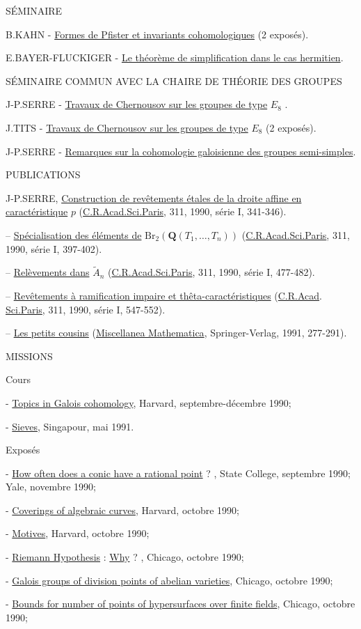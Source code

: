 \documentclass[11pt]{article}
\newcommand{\uline}[1]{\underline{#1}}
\begin{document}
SÉMINAIRE

B.KAHN - \uline{Formes de Pfister et invariants cohomologiques} (2 exposés).

E.BAYER-FLUCKIGER - \uline{Le théorème de simplification dans le cas hermitien}.

SÉMINAIRE COMMUN AVEC LA CHAIRE DE THÉORIE DES GROUPES

J-P.SERRE - \uline{Travaux de Chernousov sur les groupes de type} $E_8$ .

J.TITS - \uline{Travaux de Chernousov sur les groupes de type} $E_8$ (2 exposés).

J-P.SERRE - \uline{Remarques sur la cohomologie galoisienne des groupes semi-simples}.

PUBLICATIONS

J-P.SERRE, \uline{Construction de revêtements étales de la droite affine en}
\uline{caractéristique} $p$ (\uline{C.R.Acad.Sci.Paris}, 311, 1990, série I, 341-346).

-- \uline{Spécialisation des éléments de} $\mathrm{Br}_2(\mathbf{Q}(T_1,\dots,T_n))$ (\uline{C.R.Acad.Sci.Paris},
311, 1990, série I, 397-402).

-- \uline{Relèvements dans} $\tilde{A}_n$ (\uline{C.R.Acad.Sci.Paris}, 311, 1990, série I, 477-482).

-- \uline{Revêtements à ramification impaire et thêta-caractéristiques} (\uline{C.R.Acad}.
\uline{Sci.Paris}, 311, 1990, série I, 547-552).

-- \uline{Les petits cousins} (\uline{Miscellanea Mathematica}, Springer-Verlag, 1991,
277-291).

MISSIONS

Cours

- \uline{Topics in Galois cohomology}, Harvard, septembre-décembre 1990;

- \uline{Sieves}, Singapour, mai 1991.

Exposés

- \uline{How often does a conic have a rational point} ? , State College, septembre
1990; Yale, novembre 1990;

- \uline{Coverings of algebraic curves}, Harvard, octobre 1990;

- \uline{Motives}, Harvard, octobre 1990;

- \uline{Riemann Hypothesis} : \uline{Why} ? , Chicago, octobre 1990;

- \uline{Galois groups of division points of abelian varieties}, Chicago, octobre
1990;

- \uline{Bounds for number of points of hypersurfaces over finite fields}, Chicago,
octobre 1990;
\end{document}
